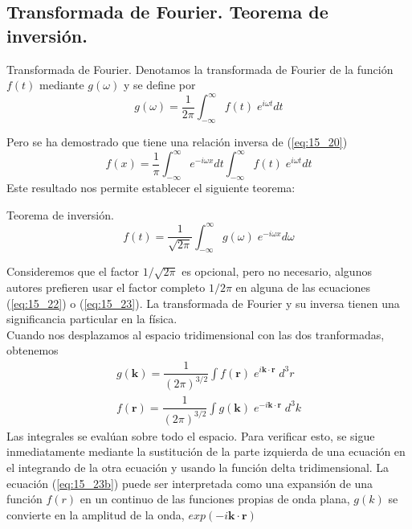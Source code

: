 \subsection{Transformada de Fourier. Teorema de inversión.}
\begin{defi}{Transformada de Fourier.}
Denotamos la transformada de Fourier de la función $f(t)$ mediante $g(\omega)$ y se define por
\begin{equation}
g(\omega) = \dfrac{1}{2 \pi} \int_{-\infty}^{\infty} f(t) \; e^{i \omega t} dt
\label{eq:15_22}
\end{equation}
\end{defi}
Pero se ha demostrado que tiene una relación inversa de (\ref{eq:15_20})
\begin{equation}
f(x) = \dfrac{1}{\pi} \int_{-\infty}^{\infty} e^{-i \omega x} dt \int_{-\infty}^{\infty} f(t) \; e^{i \omega t} dt
\label{eq:8_28}
\end{equation}
Este resultado nos permite establecer el siguiente teorema:
\begin{teo}{Teorema de inversión.}
\begin{equation}
f(t) = \dfrac{1}{\sqrt{2 \pi}} \int_{-\infty}^{\infty} g(\omega) \; e^{-i \omega x} d \omega
\label{eq:15_23}
\end{equation}
\end{teo}
Consideremos que el factor $1/\sqrt{2 \pi}$ es opcional, pero no necesario, algunos autores prefieren usar el factor completo $1/2\pi$ en alguna de las ecuaciones (\ref{eq:15_22}) o (\ref{eq:15_23}). La transformada de Fourier y su inversa tienen una significancia particular en la física.
\\
Cuando nos desplazamos al espacio tridimensional con las dos tranformadas, obtenemos
\begin{align}
g(\mathbf{k}) = \dfrac{1}{(2 \pi)^{3/2}} \int f (\mathbf{r}) \; e^{i \mathbf{k \cdot r}} \; d^{3} r \label{eq:15_23a} \\
f(\mathbf{r}) = \dfrac{1}{(2 \pi)^{3/2}} \int g (\mathbf{k}) \; e^{-i \mathbf{k \cdot r}} \; d^{3} k \label{eq:15_23b}
\end{align}
Las integrales se evalúan sobre todo el espacio. Para verificar esto, se sigue inmediatamente mediante la sustitución de la parte izquierda de una ecuación en el integrando de la otra ecuación y usando la función delta tridimensional. La ecuación (\ref{eq:15_23b}) puede ser interpretada como una expansión de una función $f(r)$ en un continuo de las funciones propias de onda plana, $g(k)$ se convierte en la amplitud de la onda, $exp(-i \mathbf{k \cdot r})$
